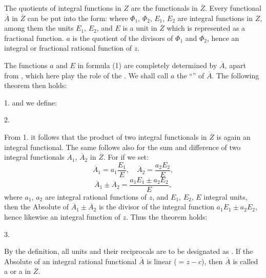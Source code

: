 
The quotients of integral functions in $Z$ are the functionals in $\overline{Z}$. Every functional $\overline{A}$ in $\overline{Z}$ can be put into the form:
where $\Phi_1$, $\Phi_2$, $E_1$, $E_2$ are integral functions in $Z$, among them the units $E_1$, $E_2$, and $E$ is a unit in $\overline{Z}$ which is represented as a fractional function. $a$ is the quotient of the divisors of $\Phi_1$ and $\Phi_2$, hence an integral or fractional rational function of $z$.

The functions $a$ and $E$ in formula (1) are completely determined by $\overline{A}$, apart from , which here play the role of the . We shall call $a$ the ``'' of $\overline{A}$. The following theorem then holds:

1. 
and we define:

2. 

From 1. it follows that the product of two integral functionals in $\overline{Z}$ is again an integral functional. The same follows also for the sum and difference of two integral functionals $\overline{A}_1$, $\overline{A}_2$ in $\overline{Z}$. For if we set:
\[
\overline{A}_1 = a_1\frac{E_1}{E}, \quad \overline{A}_2 = \frac{a_2E_2}{E},
\]
\[
\overline{A}_1 \pm \overline{A}_2 = \frac{a_1E_1 \pm a_2E_2}{E},
\]
where $a_1$, $a_2$ are integral rational functions of $z$, and $E_1$, $E_2$, $E$ integral units, then the Absolute of $\overline{A}_1 \pm \overline{A}_2$ is the divisor of the integral function $a_1E_1 \pm a_2E_2$, hence likewise an integral function of $z$. Thus the theorem holds:

3. 

By the definition, all units and their reciprocals are to be designated as . If the Absolute of an integral rational functional $\overline{A}$ is linear ($= z - c$), then $\overline{A}$ is called a  or a  in $\overline{Z}$.
